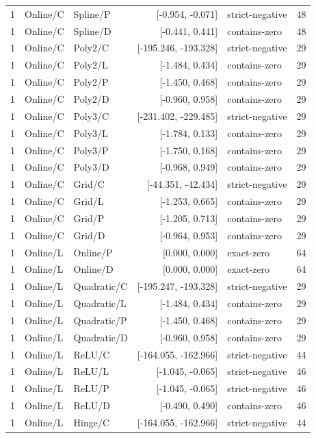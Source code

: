 \begin{longtable}{lllrlr}
1 & Online/C & Spline/P & [-0.954, -0.071] & strict-negative & 48 \\
1 & Online/C & Spline/D & [-0.441, 0.441] & contains-zero & 48 \\
1 & Online/C & Poly2/C & [-195.246, -193.328] & strict-negative & 29 \\
1 & Online/C & Poly2/L & [-1.484, 0.434] & contains-zero & 29 \\
1 & Online/C & Poly2/P & [-1.450, 0.468] & contains-zero & 29 \\
1 & Online/C & Poly2/D & [-0.960, 0.958] & contains-zero & 29 \\
1 & Online/C & Poly3/C & [-231.402, -229.485] & strict-negative & 29 \\
1 & Online/C & Poly3/L & [-1.784, 0.133] & contains-zero & 29 \\
1 & Online/C & Poly3/P & [-1.750, 0.168] & contains-zero & 29 \\
1 & Online/C & Poly3/D & [-0.968, 0.949] & contains-zero & 29 \\
1 & Online/C & Grid/C & [-44.351, -42.434] & strict-negative & 29 \\
1 & Online/C & Grid/L & [-1.253, 0.665] & contains-zero & 29 \\
1 & Online/C & Grid/P & [-1.205, 0.713] & contains-zero & 29 \\
1 & Online/C & Grid/D & [-0.964, 0.953] & contains-zero & 29 \\
1 & Online/L & Online/P & [0.000, 0.000] & exact-zero & 64 \\
1 & Online/L & Online/D & [0.000, 0.000] & exact-zero & 64 \\
1 & Online/L & Quadratic/C & [-195.247, -193.328] & strict-negative & 29 \\
1 & Online/L & Quadratic/L & [-1.484, 0.434] & contains-zero & 29 \\
1 & Online/L & Quadratic/P & [-1.450, 0.468] & contains-zero & 29 \\
1 & Online/L & Quadratic/D & [-0.960, 0.958] & contains-zero & 29 \\
1 & Online/L & ReLU/C & [-164.055, -162.966] & strict-negative & 44 \\
1 & Online/L & ReLU/L & [-1.045, -0.065] & strict-negative & 46 \\
1 & Online/L & ReLU/P & [-1.045, -0.065] & strict-negative & 46 \\
1 & Online/L & ReLU/D & [-0.490, 0.490] & contains-zero & 46 \\
1 & Online/L & Hinge/C & [-164.055, -162.966] & strict-negative & 44 \\

\end{longtable}
